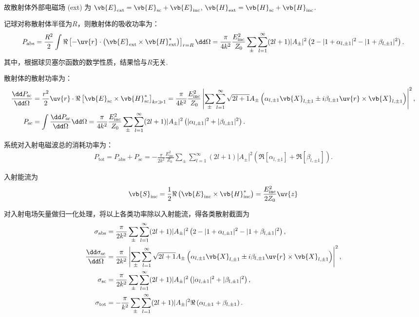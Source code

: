 故散射体外部电磁场 (ext) 为
\(\vb{E}_{\text{ext}}=\vb{E}_{\text{sc}}+\vb{E}_{\text{inc}}\), \(\vb{H}_{\text{ext}}=\vb{H}_{\text{sc}}+\vb{H}_{\text{inc}}\).

记球对称散射体半径为\(R\)，则散射体的吸收功率为：
\begin{align*}
	P_{\text{abs}} = \frac{R^2}{2}\int\Re\left[-\uv{r}\cdot\left(\vb{E}_{\text{ext}}\times\vb{H}_{\text{ext}}^*\right)\right]_{r=R}\dd \Omega = \frac{\pi}{4k^2}\frac{E_{\text{inc}}^2}{Z_0}\sum_{\pm}\sum_{l=1}^{\infty}(2l+1)|A_{\pm}|^2\left(2-|1+\alpha_{l,\pm1}|^2-|1+\beta_{l,\pm1}|^2\right).
\end{align*}
其中，根据球贝塞尔函数的数学性质，结果恰与\(R\)无关.

散射体的散射功率为：
\begin{align*}
	\frac{\dd P_{\text{sc}}}{\dd \Omega} & = \frac{r^2}{2}\uv{r}\cdot\Re\left[\vb{E}_{\text{sc}}\times\vb{H}_{\text{sc}}^*\right]_{kr\gg1}  = \frac{\pi}{4k^2}\frac{E_{\text{inc}}^2}{Z_0}\left|\sum_{\pm}\sum_{l=1}^{\infty}\sqrt{2l+1}A_{\pm}\left(\alpha_{l,\pm1}\vb{X}_{l,\pm1}\pm i\beta_{l,\pm1}\uv{r}\times\vb{X}_{l,\pm1}\right)\right|^2, \\
	P_{\text{sc}}                      & = \int\frac{\dd P_{\text{sc}}}{\dd \Omega}\dd \Omega = \frac{\pi}{4k^2}\frac{E_{\text{inc}}^2}{Z_0}\sum_{\pm}\sum_{l=1}^{\infty}(2l+1)|A_{\pm}|^2\left(|\alpha_{l,\pm1}|^2+|\beta_{l,\pm1}|^2\right).
\end{align*}

系统对入射电磁波总的消耗功率为：
\begin{align*}
	P_{\text{tot}}=P_{\text{abs}}+P_{\text{sc}}=-\frac{\pi}{2k^2}\frac{E_{\text{inc}}^2}{Z_0}\sum_{\pm}\sum_{l=1}^{\infty}(2l+1)|A_{\pm}|^2\left(\Re[\alpha_{l,\pm1}]+\Re[\beta_{l,\pm1}]\right).
\end{align*}

入射能流为
\begin{align*}
	\vb{S}_{\text{inc}}=\frac{1}{2}\Re\left(\vb{E}_{\text{inc}}\times\vb{H}_{\text{inc}}^*\right)=\frac{E_{\text{inc}}^2}{2Z_0}\uv{z}
\end{align*}

对入射电场矢量做归一化处理，将以上各类功率除以入射能流，得各类散射截面为
\begin{align*}
	\sigma_{\text{abs}}                     & = \frac{\pi}{2k^2}\sum_{\pm}\sum_{l=1}^{\infty}(2l+1)|A_{\pm}|^2\left(2-|1+\alpha_{l,\pm1}|^2-|1+\beta_{l,\pm1}|^2\right),                                                 \\
	\frac{\dd \sigma_{\text{sc}}}{\dd \Omega} & = \frac{\pi}{2k^2}\left|\sum_{\pm}\sum_{l=1}^{\infty}\sqrt{2l+1}A_{\pm}\left(\alpha_{l,\pm1}\vb{X}_{l,\pm1}\pm i\beta_{l,\pm1}\uv{r}\times\vb{X}_{l,\pm1}\right)\right|^2, \\
	\sigma_{\text{sc}}                      & = \frac{\pi}{2k^2}\sum_{\pm}\sum_{l=1}^{\infty}(2l+1)|A_{\pm}|^2\left(|\alpha_{l,\pm1}|^2+|\beta_{l,\pm1}|^2\right),                                                       \\
	\sigma_{\text{tot}}                     & = -\frac{\pi}{k^2}\sum_{\pm}\sum_{l=1}^{\infty}(2l+1)|A_{\pm}|^2\Re\left(\alpha_{l,\pm1}+\beta_{l,\pm1}\right).
\end{align*}


